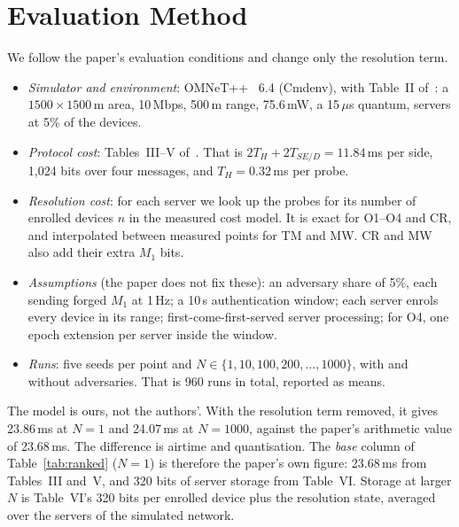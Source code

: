 \section{Evaluation Method}\label{sec:method}
We follow the paper's evaluation conditions and change only the resolution term.
\begin{itemize}
\item \emph{Simulator and environment}: OMNeT++~\cite{omnet} 6.4 (Cmdenv), with Table~II of~\cite{base}: a
$1500\times1500$\,m area, 10\,Mbps, 500\,m range, 75.6\,mW, a 15\,$\mu$s quantum, servers at 5\% of the devices.
\item \emph{Protocol cost}: Tables~III--V of~\cite{base}. That is $2T_H+2T_{SE/D}=11.84$\,ms per side, 1{,}024 bits over
four messages, and $T_H=0.32$\,ms per probe.
\item \emph{Resolution cost}: for each server we look up the probes for its number of enrolled devices $n$ in the
measured cost model. It is exact for O1--O4 and CR, and interpolated between measured points for TM and MW. CR and MW
also add their extra $M_1$ bits.
\item \emph{Assumptions} (the paper does not fix these): an adversary share of 5\%, each sending forged $M_1$ at 1\,Hz; a
10\,s authentication window; each server enrols every device in its range; first-come-first-served server processing;
for O4, one epoch extension per server inside the window.
\item \emph{Runs}: five seeds per point and $N\in\{1,10,100,200,\dots,1000\}$, with and without adversaries. That is
960 runs in total, reported as means.
\end{itemize}
The model is ours, not the authors'. With the resolution term removed, it gives 23.86\,ms at $N=1$ and 24.07\,ms at
$N=1000$, against the paper's arithmetic value of 23.68\,ms. The difference is airtime and quantisation. The
\emph{base} column of Table~\ref{tab:ranked} ($N=1$) is therefore the paper's own figure: 23.68\,ms from Tables~III and~V,
and 320 bits of server storage from Table~VI. Storage at larger $N$ is Table~VI's 320 bits per enrolled device plus the
resolution state, averaged over the servers of the simulated network.

